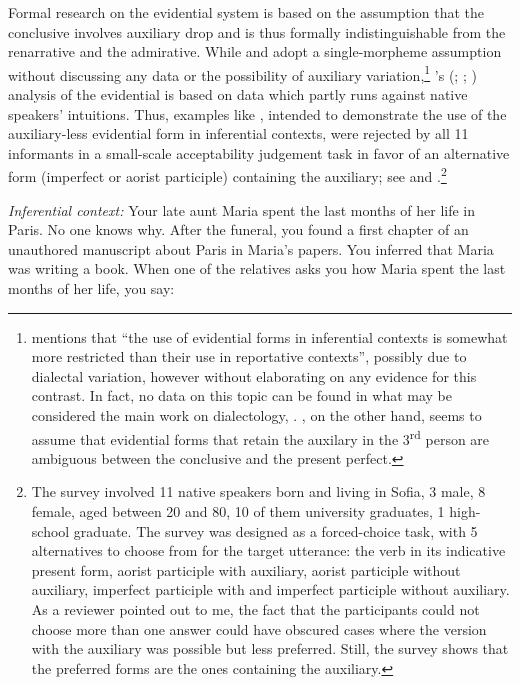 \documentclass[output=paper,
colorlinks,
citecolor=brown,
newtxmath
]{langscibook}
\begin{document}
Formal research on the  evidential system is based on the assumption that the conclusive involves auxiliary drop and is thus formally indistinguishable from the renarrative and the admirative. While \citet{Izvorski1997} and \citet{Koev2017} adopt a single-morpheme assumption without discussing any data or the possibility of auxiliary variation,\footnote{\citet[3, fn. 2]{Koev2017} mentions that ``the use of evidential forms in inferential contexts is somewhat more restricted than their use in reportative contexts'', possibly due to dialectal variation, however without elaborating on any evidence for this contrast. In fact, no data on this topic can be found in what may be considered the main work on  dialectology, \citet{Stoykov2002}. \citet{Izvorski1997}, on the other hand, seems to assume that evidential forms that retain the auxilary in the 3\textsuperscript{rd} person are ambiguous between the conclusive and the present perfect.}
\citeauthor{Smirnova2013}'s (\citeyear{Smirnova2011a}; \citeyear{Smirnova2011b}; \citeyear{Smirnova2013}) analysis of the evidential is based on data which partly runs against native speakers' intuitions. Thus, examples like , intended to demonstrate the use of the auxiliary-less evidential form in inferential contexts, were rejected by all 11 informants in a small-scale acceptability judgement task in favor of an alternative form (imperfect or aorist participle) containing the auxiliary; see  and .\footnote{The survey involved 11 native speakers born and living in Sofia, 3 male, 8 female, aged between 20 and 80, 10 of them university graduates, 1 high-school graduate. The survey was designed as a forced-choice task, with 5 alternatives to choose from for the target utterance: the verb in its indicative present form, aorist participle with auxiliary, aorist participle without auxiliary, imperfect participle with and imperfect participle without auxiliary. As a reviewer pointed out to me, the fact that the participants could not choose more than one answer could have obscured cases where the version with the auxiliary was possible but less preferred. Still, the survey shows that the preferred forms are the ones containing the auxiliary.}

\eanoraggedright \textit{Inferential context:} Your late aunt Maria spent the
last months of her life in Paris. No one knows why. After the
funeral, you found a first chapter of an unauthored manuscript about Paris in Maria’s papers. You inferred that Maria was writing a book. When one of the relatives asks you how Maria spent the last months of her life, you say:\vspace{-6pt}\label{smirnova:infer-acceptability}
\z
\begin{exe}
\end{exe}
\end{document}
